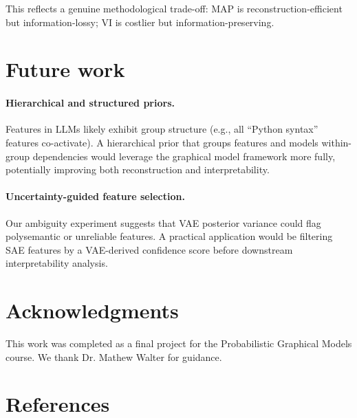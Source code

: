 \documentclass{article}
\begin{document}
This reflects a genuine methodological trade-off: MAP is reconstruction-efficient but information-lossy; VI is costlier but information-preserving.


\section{Future work}
\label{sec:future}

\paragraph{Hierarchical and structured priors.}
Features in LLMs likely exhibit group structure (e.g., all ``Python syntax'' features co-activate). A hierarchical prior that groups features and models within-group dependencies would leverage the graphical model framework more fully, potentially improving both reconstruction and interpretability.

\paragraph{Uncertainty-guided feature selection.}
Our ambiguity experiment suggests that VAE posterior variance could flag polysemantic or unreliable features. A practical application would be filtering SAE features by a VAE-derived confidence score before downstream interpretability analysis.


\section*{Acknowledgments}

This work was completed as a final project for the Probabilistic Graphical Models course. We thank Dr. Mathew Walter for guidance.

\section*{References}
\end{document}
